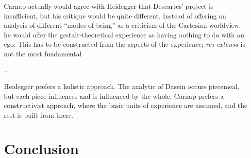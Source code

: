 \documentclass[leqno, 12pt]{turabian-researchpaper}
\begin{document}
	Carnap actually would agree with Heidegger that Descartes' project is insufficient,
	but his critique would be quite different. Instead of offering an analysis of different
	\enquote{modes of being} as a criticism of the Cartesian worldview, he would offer
	the gestalt-theoretical experience as having nothing to do with an ego. This
	has to be constructed from the aspects of the experience; \textit{res extensa}
	is not the most fundamental

	--

	Heidegger prefers a holistic approach. The analytic of Dasein occurs piecemeal,
	but each piece influences and is influenced by the whole. Carnap prefers a
	constructivist approach, where the basic units of experience are assumed, and
	the rest is built from there.

	\section{Conclusion}

	\printbibliography
\end{document}
